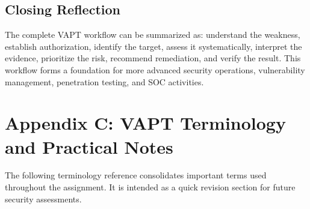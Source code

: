 \documentclass[11pt,a4paper]{article}
\begin{document}
\subsection{Closing Reflection}
The complete VAPT workflow can be summarized as: understand the weakness, establish authorization, identify the target, assess it systematically, interpret the evidence, prioritize the risk, recommend remediation, and verify the result. This workflow forms a foundation for more advanced security operations, vulnerability management, penetration testing, and SOC activities.


\newpage
\section{Appendix C: VAPT Terminology and Practical Notes}
The following terminology reference consolidates important terms used throughout the assignment. It is intended as a quick revision section for future security assessments.
\end{document}

